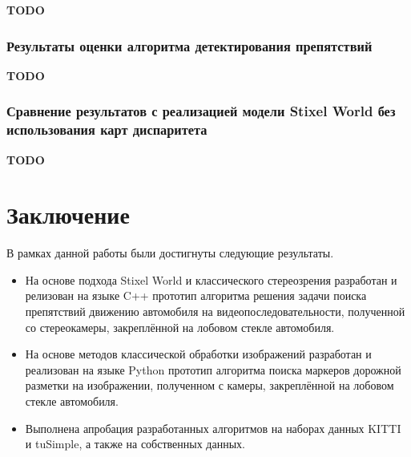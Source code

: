 \documentclass[aps,%
14pt,%
final,%
oneside,
onecolumn,%
musixtex, %
superscriptaddress,%
centertags]{extarticle} %
\begin{document}
\textbf{\Large \color{Red} TODO}

\subsubsection{Результаты оценки алгоритма детектирования препятствий}

\textbf{\Large \color{Red} TODO}

\subsubsection{Сравнение результатов с реализацией модели Stixel World без использования карт диспаритета}

\textbf{\Large \color{Red} TODO}

\newpage
\section{Заключение}

В рамках данной работы были достигнуты следующие результаты.

\begin{itemize}
\item На основе подхода Stixel World и классического стереозрения разработан и релизован на языке C++ прототип алгоритма решения задачи поиска препятствий движению автомобиля на видеопоследовательности, полученной со стереокамеры, закреплённой на лобовом стекле автомобиля.

\item На основе методов классической обработки изображений разработан и реализован на языке Python прототип алгоритма поиска маркеров дорожной разметки на изображении, полученном с камеры, закреплённой на лобовом стекле автомобиля.

\item Выполнена апробация разработанных алгоритмов на наборах данных KITTI и tuSimple, а также на собственных данных.

\end{itemize}

\newpage



\end{document}
